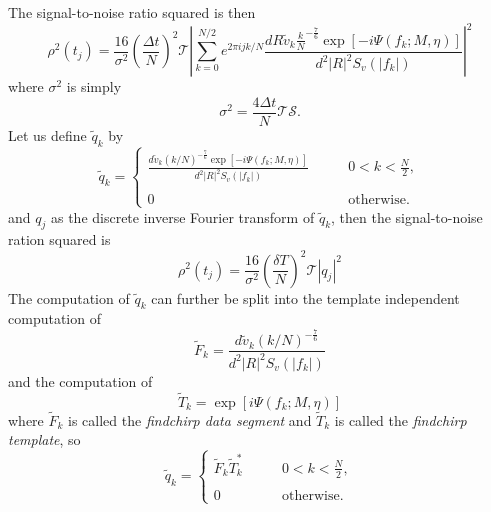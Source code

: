 The signal-to-noise ratio squared is then
\begin{equation}
\rho^2(t_j) = 
\frac{16}{\sigma^2}\left(\frac{\Delta t}{N}\right)^2 \mathcal{T}
\left| 
  \sum_{k=0}^{N/2} e^{2\pi ijk/N} 
  \frac{dR\tilde{v}_k \frac{k}{N}^{-\frac{7}{6}} \exp\left[-i\Psi(f_k;M,\eta)\right]}
       {d^2|R|^2 S_v\left(\left|f_k\right|\right)}
\right|^2 
\label{eq:signaltonoisesq}
\end{equation}
where $\sigma^2$ is simply
\begin{equation}
\sigma^2 = \frac{4\Delta t}{N} \mathcal{T}\mathcal{S}.
\label{eq:sigmasqts}
\end{equation}
Let us define $\tilde{q}_k$ by
\begin{equation}
\label{eq:qtildedef}
\tilde{q}_k = \left\{
\begin{array}{ll}
\frac{d\tilde{v}_k (k/N)^{-\frac{7}{6}} \exp\left[-i\Psi(f_k;M,\eta)\right]}
     {d^2|R|^2S_v\left(\left|f_k\right|\right)} 
  \quad\quad & 0 < k < \frac{N}{2},\\
\\
0 & \mathrm{otherwise}.
\end{array}
\right.
\end{equation}
and $q_j$ as the discrete inverse Fourier transform of $\tilde{q}_k$, then
the signal-to-noise ration squared is
\begin{equation}
\rho^2(t_j) = \frac{16}{\sigma^2}\left(\frac{\delta T}{N}\right)^2 \mathcal{T}
\left|q_j\right|^2
\end{equation}
The computation of $\tilde{q}_k$ can further be split into the template
independent computation of
\begin{equation}
\tilde{F}_k = \frac{d\tilde{v}_k (k/N)^{-\frac{7}{6}}}
{d^2|R|^2S_v\left(\left|f_k\right|\right)}
\end{equation}
and the computation of
\begin{equation}
\tilde{T}_k = \exp\left[i\Psi(f_k;M,\eta)\right]
\end{equation}
where $\tilde{F}_k$ is called the \emph{findchirp data segment} and 
$\tilde{T}_k$ is called the \emph{findchirp template}, so
\begin{equation}
\tilde{q}_k = \left\{
\begin{array}{ll}
\tilde{F}_k \tilde{T}_k^\ast \quad\quad & 0 < k < \frac{N}{2},\\
\\
0 & \mathrm{otherwise}.
\end{array}
\right.
\end{equation}

